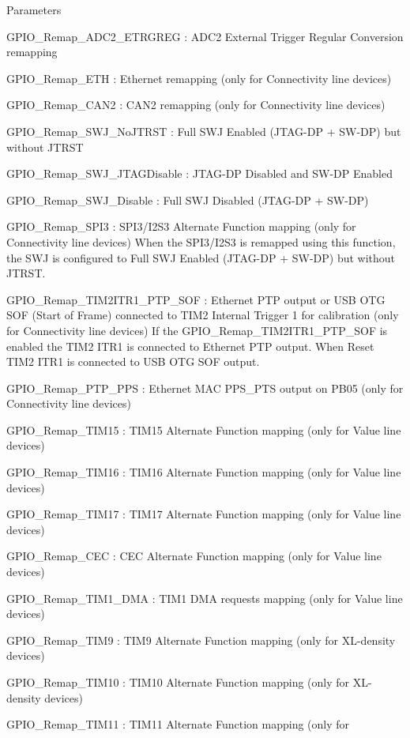 \begin{DoxyParams}{Parameters}
\begin{DoxyItemize}
G\+P\+I\+O\+\_\+\+Remap\+\_\+\+A\+D\+C2\+\_\+\+E\+T\+R\+G\+R\+EG \+: A\+D\+C2 External Trigger Regular Conversion remapping \item G\+P\+I\+O\+\_\+\+Remap\+\_\+\+E\+TH \+: Ethernet remapping (only for Connectivity line devices) \item G\+P\+I\+O\+\_\+\+Remap\+\_\+\+C\+A\+N2 \+: C\+A\+N2 remapping (only for Connectivity line devices) \item G\+P\+I\+O\+\_\+\+Remap\+\_\+\+S\+W\+J\+\_\+\+No\+J\+T\+R\+ST \+: Full S\+WJ Enabled (J\+T\+A\+G-\/\+DP + S\+W-\/\+DP) but without J\+T\+R\+ST \item G\+P\+I\+O\+\_\+\+Remap\+\_\+\+S\+W\+J\+\_\+\+J\+T\+A\+G\+Disable \+: J\+T\+A\+G-\/\+DP Disabled and S\+W-\/\+DP Enabled \item G\+P\+I\+O\+\_\+\+Remap\+\_\+\+S\+W\+J\+\_\+\+Disable \+: Full S\+WJ Disabled (J\+T\+A\+G-\/\+DP + S\+W-\/\+DP) \item G\+P\+I\+O\+\_\+\+Remap\+\_\+\+S\+P\+I3 \+: S\+P\+I3/\+I2\+S3 Alternate Function mapping (only for Connectivity line devices) When the S\+P\+I3/\+I2\+S3 is remapped using this function, the S\+WJ is configured to Full S\+WJ Enabled (J\+T\+A\+G-\/\+DP + S\+W-\/\+DP) but without J\+T\+R\+ST. \item G\+P\+I\+O\+\_\+\+Remap\+\_\+\+T\+I\+M2\+I\+T\+R1\+\_\+\+P\+T\+P\+\_\+\+S\+OF \+: Ethernet P\+TP output or U\+SB O\+TG S\+OF (Start of Frame) connected to T\+I\+M2 Internal Trigger 1 for calibration (only for Connectivity line devices) If the G\+P\+I\+O\+\_\+\+Remap\+\_\+\+T\+I\+M2\+I\+T\+R1\+\_\+\+P\+T\+P\+\_\+\+S\+OF is enabled the T\+I\+M2 I\+T\+R1 is connected to Ethernet P\+TP output. When Reset T\+I\+M2 I\+T\+R1 is connected to U\+SB O\+TG S\+OF output. \item G\+P\+I\+O\+\_\+\+Remap\+\_\+\+P\+T\+P\+\_\+\+P\+PS \+: Ethernet M\+AC P\+P\+S\+\_\+\+P\+TS output on P\+B05 (only for Connectivity line devices) \item G\+P\+I\+O\+\_\+\+Remap\+\_\+\+T\+I\+M15 \+: T\+I\+M15 Alternate Function mapping (only for Value line devices) \item G\+P\+I\+O\+\_\+\+Remap\+\_\+\+T\+I\+M16 \+: T\+I\+M16 Alternate Function mapping (only for Value line devices) \item G\+P\+I\+O\+\_\+\+Remap\+\_\+\+T\+I\+M17 \+: T\+I\+M17 Alternate Function mapping (only for Value line devices) \item G\+P\+I\+O\+\_\+\+Remap\+\_\+\+C\+EC \+: C\+EC Alternate Function mapping (only for Value line devices) \item G\+P\+I\+O\+\_\+\+Remap\+\_\+\+T\+I\+M1\+\_\+\+D\+MA \+: T\+I\+M1 D\+MA requests mapping (only for Value line devices) \item G\+P\+I\+O\+\_\+\+Remap\+\_\+\+T\+I\+M9 \+: T\+I\+M9 Alternate Function mapping (only for X\+L-\/density devices) \item G\+P\+I\+O\+\_\+\+Remap\+\_\+\+T\+I\+M10 \+: T\+I\+M10 Alternate Function mapping (only for X\+L-\/density devices) \item G\+P\+I\+O\+\_\+\+Remap\+\_\+\+T\+I\+M11 \+: T\+I\+M11 Alternate Function mapping (only for 
\end{DoxyItemize}
\end{DoxyParams}
